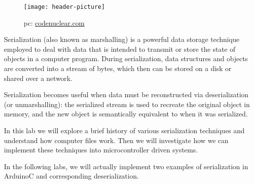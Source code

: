 \begin{wrapfigure}{l}{0.5\textwidth}
\texttt{[image: header-picture]}
\caption*{pc: \href{https://www.codenuclear.com/serialization-deserialization-java/}{codenuclear.com}}
\end{wrapfigure}

Serialization (also known as marshalling) is a powerful data storage technique employed to deal with data that is intended to transmit or store the state of objects in a computer program. During serialization, data structures and objects are converted into a stream of bytes, which then can be stored on a disk or shared over a network. 

Serialization becomes useful when data must be reconstructed via deserialization (or unmarshalling): the serialized stream is used to recreate the original object in memory, and the new object is semantically equivalent to when it was serialized. 

In this lab we will explore a brief history of various serialization techniques and understand how computer files work. Then we will investigate how we can implement these techniques into microcontroller driven systems.

In the following labs, we will actually implement two examples of serialization in ArduinoC and corresponding deserialization. 
